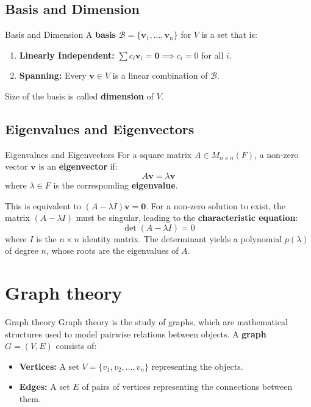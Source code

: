 \documentclass{beamer}
\begin{document}
\subsection{Basis and Dimension}
\begin{frame}{Basis and Dimension}
    A \textbf{basis} $\mathcal{B} = \{\mathbf{v}_1, \dots, \mathbf{v}_n\}$ for $V$ is a set that is:
    \begin{enumerate}
        \item \textbf{Linearly Independent:} $\sum c_i \mathbf{v}_i = \mathbf{0} \implies c_i = 0$ for all $i$.
        \item \textbf{Spanning:} Every $\mathbf{v} \in V$ is a linear combination of $\mathcal{B}$.
    \end{enumerate}
    \vfill
    Size of the basis is called \textbf{dimension} of $V$.
\end{frame}

\subsection{Eigenvalues and Eigenvectors}
\begin{frame}{Eigenvalues and Eigenvectors}
    For a square matrix $A \in M_{n \times n}(F)$, a non-zero vector $\mathbf{v}$ is an \textbf{eigenvector} if:
    \[A\mathbf{v} = \lambda\mathbf{v}\]
    where $\lambda \in F$ is the corresponding \textbf{eigenvalue}.

    \vfill

    This is equivalent to $(A - \lambda I)\mathbf{v} = \mathbf{0}$. For a non-zero solution to exist, the matrix $(A - \lambda I)$ must be singular, leading to the \textbf{characteristic equation}:
    \[\det(A - \lambda I) = 0\]
    where $I$ is the $n \times n$ identity matrix. The determinant yields a polynomial $p(\lambda)$ of degree $n$, whose roots are the eigenvalues of $A$.
\end{frame}

\section{Graph theory}
\begin{frame}{Graph theory}
    Graph theory is the study of graphs, which are mathematical structures used to model pairwise relations between objects.
    \vfill
    A \textbf{graph} $G = (V, E)$ consists of:
    \begin{itemize}
        \item \textbf{Vertices:} A set $V = \{v_1, v_2, \dots, v_n\}$ representing the objects.
        \item \textbf{Edges:} A set $E$ of pairs of vertices representing the connections between them.
    \end{itemize}
\end{frame}
\end{document}
